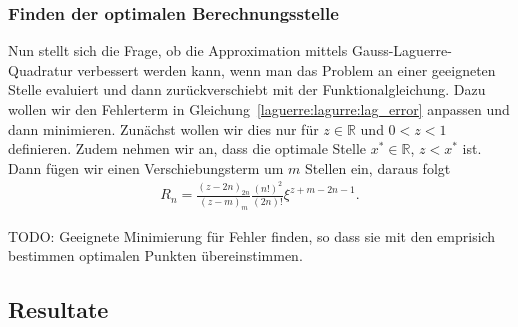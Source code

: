 \subsubsection{Finden der optimalen Berechnungsstelle}
Nun stellt sich die Frage,
ob die Approximation mittels Gauss-Laguerre-Quadratur verbessert werden kann,
wenn man das Problem an einer geeigneten Stelle evaluiert und
dann zurückverschiebt mit der Funktionalgleichung.
Dazu wollen wir den Fehlerterm in
Gleichung~\eqref{laguerre:lagurre:lag_error} anpassen und dann minimieren.
Zunächst wollen wir dies nur für $z\in \mathbb{R}$ und $0<z<1$ definieren.
Zudem nehmen wir an, dass die optimale Stelle $x^* \in \mathbb{R}$, $z < x^*$
ist.
Dann fügen wir einen Verschiebungsterm um $m$ Stellen ein, daraus folgt
\begin{align*}
R_n
=
\frac{(z - 2n)_{2n}}{(z - m)_m} \frac{(n!)^2}{(2n)!} \xi^{z + m - 2n - 1}
.
\end{align*}

{
\large \color{red}
TODO:
Geeignete Minimierung für Fehler finden, so dass sie mit den emprisich
bestimmen optimalen Punkten übereinstimmen.
}

\subsection{Resultate}
